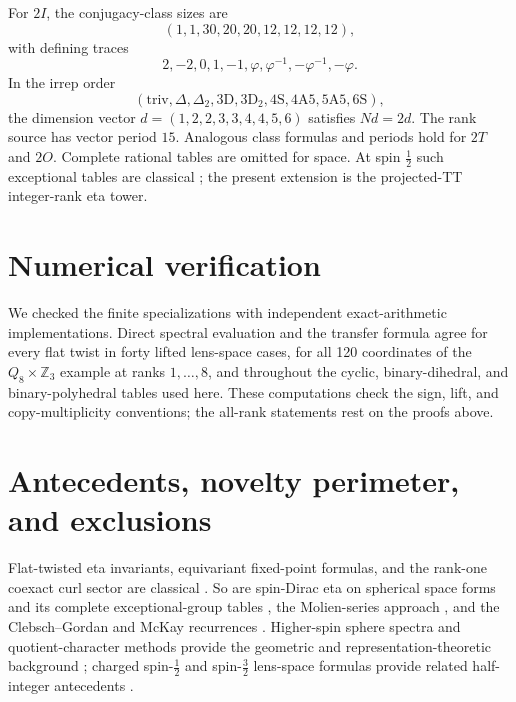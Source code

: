 \documentclass[11pt]{article}
\theoremstyle{definition}
\begin{document}
For $2I$, the conjugacy-class sizes are
\[
 (1,1,30,20,20,12,12,12,12),
\]
with defining traces
\[
 2,-2,0,1,-1,\varphi,\varphi^{-1},-\varphi^{-1},-\varphi.
\]
In the irrep order
\[
 (\mathrm{triv},\Delta,\Delta_2,\mathrm{3D},\mathrm{3D}_2,
  \mathrm{4S},\mathrm{4A5},\mathrm{5A5},\mathrm{6S}),
\]
the dimension vector $d=(1,2,2,3,3,4,4,5,6)$ satisfies $Nd=2d$.
The rank source has vector period $15$.  Analogous class formulas and periods
hold for $2T$ and $2O$.  Complete rational tables are omitted for space.  At
spin $\tfrac12$ such exceptional tables are classical
\cite{CisnerosMolina2001}; the present extension is the projected-TT
integer-rank eta tower.

\section{Numerical verification}

We checked the finite specializations with independent exact-arithmetic
implementations.  Direct spectral evaluation and the transfer formula agree
for every flat twist in forty lifted lens-space cases, for all 120 coordinates
of the $Q_8\times\mathbb Z_3$ example at ranks $1,\ldots,8$, and throughout the
cyclic, binary-dihedral, and binary-polyhedral tables used here.  These
computations check the sign, lift, and copy-multiplicity conventions; the
all-rank statements rest on the proofs above.

\section{Antecedents, novelty perimeter, and exclusions}
\label{sec:scope}

Flat-twisted eta invariants, equivariant fixed-point formulas, and the
rank-one coexact curl sector are classical
\cite{APS1975,Donnelly1978,Gilkey1984,Bar2019}.  So are spin-Dirac eta on
spherical space forms and its complete exceptional-group tables
\cite{Seade1981,Bar1992,Bar1996,Goette1997,CisnerosMolina2001}, the
Molien-series approach \cite{Degeratu2009,Degeratu2001}, and the
Clebsch--Gordan and McKay recurrences
\cite{McKay1980,Kostant1985,Rossmann2003}.  Higher-spin sphere spectra and
quotient-character methods provide the geometric and representation-theoretic
background \cite{Homma2001,HommaTomihisa2021,Dowker2007,
CastroLashkariMaloney2011}; charged spin-$\tfrac12$ and spin-$\tfrac32$
lens-space formulas provide related half-integer antecedents
\cite{BasileLeone2023,DebrayEtAl2023}.
\end{document}
